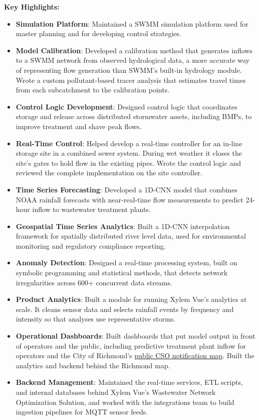 \documentclass[a4paper,11pt]{article}
\begin{document}
{\small \textbf{Key Highlights:}}
\vspace{-2mm}
\begin{itemize}
	\setlength\itemsep{1mm}
	\item \textbf{Simulation Platform}: Maintained a SWMM simulation platform used for master planning and for developing control strategies.
	\item \textbf{Model Calibration}: Developed a calibration method that generates inflows to a SWMM network from observed hydrological data, a more accurate way of representing flow generation than SWMM's built-in hydrology module. Wrote a custom pollutant-based tracer analysis that estimates travel times from each subcatchment to the calibration points.
	\item \textbf{Control Logic Development}: Designed control logic that coordinates storage and release across distributed stormwater assets, including BMPs, to improve treatment and shave peak flows.
	\item \textbf{Real-Time Control}: Helped develop a real-time controller for an in-line storage site in a combined sewer system. During wet weather it closes the site's gates to hold flow in the existing pipes. Wrote the control logic and reviewed the complete implementation on the site controller.
	\item \textbf{Time Series Forecasting}: Developed a 1D-CNN model that combines NOAA rainfall forecasts with near-real-time flow measurements to predict 24-hour inflow to wastewater treatment plants.
	\item \textbf{Geospatial Time Series Analytics}: Built a 1D-CNN interpolation framework for spatially distributed river level data, used for environmental monitoring and regulatory compliance reporting.
	\item \textbf{Anomaly Detection}: Designed a real-time processing system, built on symbolic programming and statistical methods, that detects network irregularities across 600+ concurrent data streams.
	\item \textbf{Product Analytics}: Built a module for running Xylem Vue's analytics at scale. It cleans sensor data and selects rainfall events by frequency and intensity so that analyses use representative storms.
	\item \textbf{Operational Dashboards}: Built dashboards that put model output in front of operators and the public, including predictive treatment plant inflow for operators and the City of Richmond's \href{https://www.rva.gov/public-utilities/csooutfalls}{public CSO notification map}. Built the analytics and backend behind the Richmond map.
	\item \textbf{Backend Management}: Maintained the real-time services, ETL scripts, and internal databases behind Xylem Vue's Wastewater Network Optimization Solution, and worked with the integrations team to build ingestion pipelines for MQTT sensor feeds.
\end{itemize}
\end{document}
